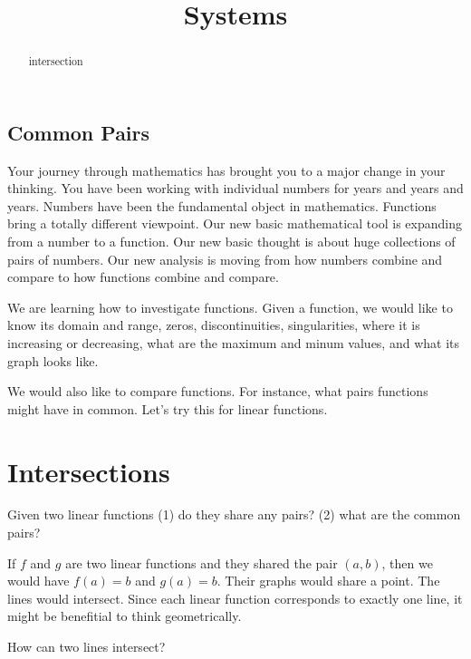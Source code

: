\documentclass{ximera}
\title{Systems}
\begin{document}
\begin{abstract}
intersection
\end{abstract}
\maketitle



\subsection{Common Pairs}

Your journey through mathematics has brought you to a major change in your thinking. You have been working with individual numbers for years and years and years. Numbers have been the fundamental object in mathematics. Functions bring a totally different viewpoint. Our new basic mathematical tool is expanding from a number to a function.  Our new basic thought is about huge collections of pairs of numbers.  Our new analysis is moving from how numbers combine and compare to how functions combine and compare.

We are learning how to investigate functions.  Given a function, we would like to know its domain and range, zeros, discontinuities, singularities, where it is increasing or decreasing, what are the maximum and minum values, and what its graph looks like.

We would also like to compare functions.  For instance, what pairs functions might have in common. Let's try this for linear functions.



\section{Intersections}

Given two linear functions (1) do they share any pairs? (2) what are the common pairs?



If $f$ and $g$ are two linear functions and they shared the pair $(a, b)$, then we would have $f(a)=b$ and $g(a)=b$.  Their graphs would share a point. The lines would intersect. Since each linear function corresponds to exactly one line, it might be benefitial to think geometrically.  

How can two lines intersect?
\end{document}
